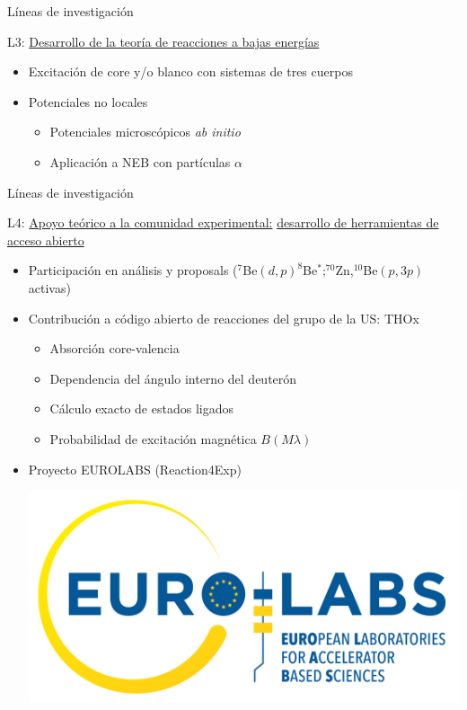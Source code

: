 \documentclass{beamer}
\begin{document}
\begin{frame}{Líneas de investigación} 

\large {}  L3: \underline{Desarrollo de la teoría de reacciones a bajas energías} 

\normalsize
    
\begin{itemize}
\item Excitación de core y/o blanco con sistemas de tres cuerpos
\item Potenciales no locales
\begin{itemize}
\item Potenciales microscópicos \textit{ab initio}
\item Aplicación a NEB con partículas $\alpha$
\end{itemize}


\end{itemize}    
    
\end{frame}

\begin{frame}{Líneas de investigación} 

\large {}  L4: \underline{Apoyo teórico a la comunidad experimental:} \underline{desarrollo de herramientas de acceso abierto} 

\normalsize
    
\begin{itemize}
\item Participación en análisis y proposals ($^7$Be$(d,p)^8$Be$^*$;$^{70}$Zn,$^{10}$Be$(p,3p)$ activas)
\item Contribución a código abierto de reacciones del grupo de la US: THOx
\begin{itemize}
\item Absorción core-valencia
\item Dependencia del ángulo interno del deuterón
\item Cálculo exacto de estados ligados
\item Probabilidad de excitación magnética $B(M\lambda)$
\end{itemize}

\item Proyecto EUROLABS (Reaction4Exp)

\includegraphics[height=0.2\textheight]{eurolabs.jpg}   

\end{itemize}    
    
\end{frame}
\end{document}
